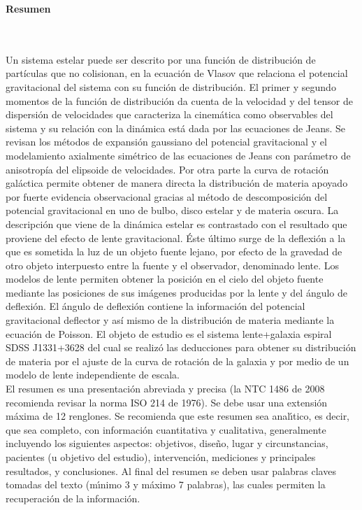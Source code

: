 \newpage
\textbf{\LARGE Resumen}
\\\\
Un sistema estelar puede ser descrito por una función de distribución de partículas que no colisionan, en la ecuación de Vlasov que relaciona el potencial gravitacional del sistema con su función de distribución. El primer y segundo momentos de la función de distribución da cuenta de la velocidad y del tensor de dispersión de velocidades que caracteriza la cinemática como observables del sistema y su relación con la dinámica está dada por las ecuaciones de Jeans. Se revisan los métodos de expansión gaussiano del potencial gravitacional y el modelamiento axialmente simétrico de las ecuaciones de Jeans con parámetro de anisotropía del elipsoide de velocidades. Por otra parte la curva de rotación galáctica permite obtener de manera directa la distribución de materia apoyado por fuerte evidencia observacional gracias al método de descomposición del potencial gravitacional en uno de bulbo, disco estelar y de materia oscura. La descripción que viene de la dinámica estelar es contrastado con el resultado que proviene del efecto de lente gravitacional. Éste último surge de la deflexión a la que es sometida la luz de un objeto fuente lejano, por efecto de la gravedad de otro objeto interpuesto entre la fuente y el observador, denominado lente. Los modelos de lente permiten obtener la posición en el cielo del objeto fuente mediante las posiciones de sus imágenes producidas por la lente y del ángulo de deflexión. El ángulo de deflexión contiene la información del potencial gravitacional deflector y así mismo de la distribución de materia mediante la ecuación de Poisson. El objeto de estudio es el sistema lente+galaxia espiral SDSS J1331+3628 del cual se realizó las deducciones para obtener su distribución de materia por el ajuste de la curva de rotación de la galaxia y por medio de un modelo de lente independiente de escala.\\

El resumen es una presentaci\'{o}n abreviada y precisa (la NTC 1486 de 2008 recomienda revisar la norma ISO 214 de 1976). Se debe usar una extensi\'{o}n m\'{a}xima de 12 renglones. Se recomienda que este resumen sea anal\'{\i}tico, es decir, que sea completo, con informaci\'{o}n cuantitativa y cualitativa, generalmente incluyendo los siguientes aspectos: objetivos, dise\~{n}o, lugar y circunstancias, pacientes (u objetivo del estudio), intervenci\'{o}n, mediciones y principales resultados, y conclusiones. Al final del resumen se deben usar palabras claves tomadas del texto (m\'{\i}nimo 3 y m\'{a}ximo 7 palabras), las cuales permiten la recuperaci\'{o}n de la informaci\'{o}n.\\

